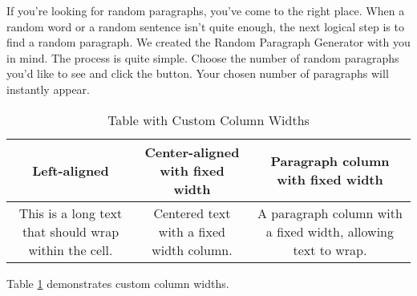 \documentclass{article}
\begin{document}
If you're looking for random paragraphs, you've come to the right place. When a random word or a random sentence isn't quite enough, the next logical step is to find a random paragraph. We created the Random Paragraph Generator with you in mind. The process is quite simple. Choose the number of random paragraphs you'd like to see and click the button. Your chosen number of paragraphs will instantly appear.

\begin{table}[p]
    \centering
    \begin{tabular}{|c|c|c|}
    \hline
         \textbf{Left-aligned} &
         \textbf{Center-aligned with fixed width} &
         \textbf{Paragraph column with fixed width}\\
         \hline

         This is a long text that should wrap within the cell. & Centered text with a fixed width column. & A paragraph column with a fixed width, allowing text to wrap. \\
         \hline
    \end{tabular}
    \caption{Table with Custom Column Widths}
    \label{tab:alignment table}
\end{table}


Table \ref{tab:alignment table} demonstrates custom column widths.
\end{document}
